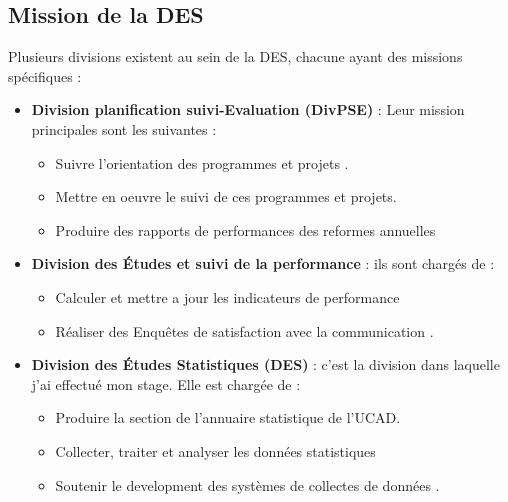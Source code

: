 \subsection{Mission de la DES} 
Plusieurs divisions existent au sein de la DES, chacune ayant des missions spécifiques :
\begin{itemize}
    \item \textbf{Division planification suivi-Evaluation (DivPSE)} : 
    Leur mission principales sont les suivantes :
    \begin{itemize}
        \item Suivre l'orientation des programmes et projets .
        \item Mettre en oeuvre le suivi de ces programmes et projets.
        \item Produire des rapports de performances des reformes annuelles
    \end{itemize}
    \item \textbf{Division des Études et suivi de la performance } :  
    ils sont chargés de :
    \begin{itemize}
        \item Calculer et mettre a jour les indicateurs de performance
        \item Réaliser des Enquêtes de satisfaction avec la communication .
    \end{itemize}
    \item \textbf{Division des Études Statistiques (DES)} : 
    c'est la division dans laquelle j'ai effectué mon stage. Elle est chargée de :
    \begin{itemize}
        \item Produire la section de l'annuaire statistique de l'UCAD.
        \item Collecter, traiter et analyser les données statistiques 
        \item Soutenir le development des systèmes de collectes de données .
        \end{itemize}
    
\end{itemize}   


